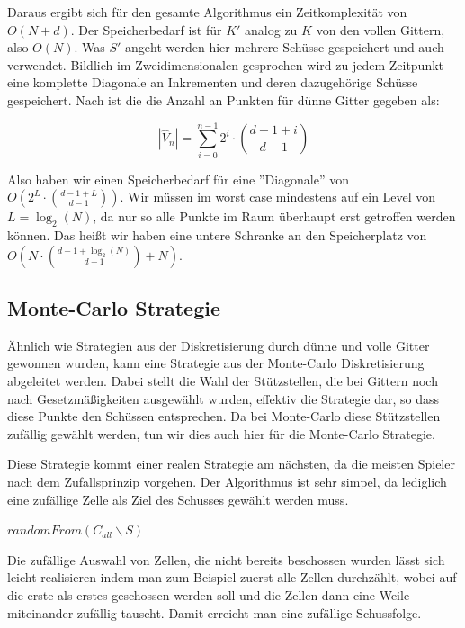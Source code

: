 \documentclass[a4paper,12pt]{llncs}
\numberwithin{equation}{section}
\begin{document}
Daraus ergibt sich für den gesamte Algorithmus ein Zeitkomplexität von $O(N+d)$. Der Speicherbedarf ist für $K'$ analog zu $K$ von den vollen Gittern, also $O(N)$. Was $S'$ angeht werden hier mehrere Schüsse gespeichert und auch verwendet. Bildlich im Zweidimensionalen gesprochen wird zu jedem Zeitpunkt eine komplette Diagonale an Inkrementen und deren dazugehörige Schüsse gespeichert. Nach \cite{GG08} ist die die Anzahl an Punkten für dünne Gitter gegeben als:

\begin{equation}
\left|\hat{V}_n\right| = \sum_{i=0}^{n-1} 2^i \cdot \binom{d-1+i}{d-1}
\end{equation}

Also haben wir einen Speicherbedarf für eine ''Diagonale'' von $O\left(2^L \cdot \binom{d-1+L}{d-1}\right)$. Wir müssen im worst case mindestens auf ein Level von $L=\log_2(N)$, da nur so alle Punkte im Raum überhaupt erst getroffen werden können. Das heißt wir haben eine untere Schranke an den Speicherplatz von $O\left(N \cdot \binom{d-1+\log_2(N)}{d-1} + N\right)$.


\subsection{Monte-Carlo Strategie}

Ähnlich wie Strategien aus der Diskretisierung durch dünne und volle Gitter gewonnen wurden, kann eine Strategie aus der Monte-Carlo Diskretisierung abgeleitet werden. Dabei stellt die Wahl der Stützstellen, die bei Gittern noch nach Gesetzmäßigkeiten ausgewählt wurden, effektiv die Strategie dar, so dass diese Punkte den Schüssen entsprechen. Da bei Monte-Carlo diese Stützstellen zufällig gewählt werden, tun wir dies auch hier für die Monte-Carlo Strategie. 

Diese Strategie kommt einer realen Strategie am nächsten, da die meisten Spieler nach dem Zufallsprinzip vorgehen. Der Algorithmus ist sehr simpel, da lediglich eine zufällige Zelle als Ziel des Schusses gewählt werden muss.

\begin{tcolorbox}
	\begin{algorithmic}
		\State \Return $randomFrom(C_{all}\backslash S)$
		\EndFunction
	\end{algorithmic}
\end{tcolorbox}

Die zufällige Auswahl von Zellen, die nicht bereits beschossen wurden lässt sich leicht realisieren indem man zum Beispiel zuerst alle Zellen durchzählt, wobei auf die erste als erstes geschossen werden soll und die Zellen dann eine Weile miteinander zufällig tauscht. Damit erreicht man eine zufällige Schussfolge.
\end{document}
